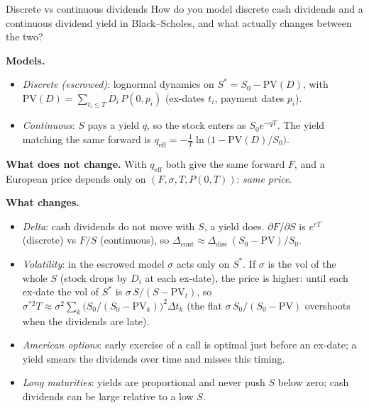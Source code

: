 \begin{question}{\Theory {}}{Discrete vs continuous dividends}
How do you model discrete cash dividends and a continuous dividend yield in
Black--Scholes, and what actually changes between the two?
\end{question}
\begin{answer}
\textbf{Models.}
\begin{itemize}[nosep]
  \item \emph{Discrete (escrowed)}: lognormal dynamics on
        $S^* = S_0 - \mathrm{PV}(D)$, with
        $\mathrm{PV}(D) = \sum_{t_i \le T} D_i\,P(0,p_i)$ (ex-dates $t_i$, payment dates $p_i$).
  \item \emph{Continuous}: $S$ pays a yield $q$, so the stock enters as
        $S_0 e^{-qT}$. The yield matching the same forward is
        $q_{\text{eff}} = -\frac{1}{T}\ln\!\big(1 - \mathrm{PV}(D)/S_0\big)$.
\end{itemize}

\textbf{What does not change.} With $q_{\text{eff}}$ both give the same
forward $F$, and a European price depends only on $(F,\sigma,T,P(0,T))$:
\emph{same price}.

\textbf{What changes.}
\begin{itemize}[nosep]
  \item \emph{Delta}: cash dividends do not move with $S$, a yield does.
        $\partial F/\partial S$ is $e^{rT}$ (discrete) vs $F/S$ (continuous),
        so $\Delta_{\text{cont}} \approx \Delta_{\text{disc}}\,(S_0-\mathrm{PV})/S_0$.
  \item \emph{Volatility}: in the escrowed model $\sigma$ acts only on $S^*$.
        If $\sigma$ is the vol of the whole $S$ (stock drops by $D_i$ at each
        ex-date), the price is higher: until each ex-date the vol of $S^*$ is
        $\sigma\,S/(S-\mathrm{PV}_t)$, so
        $\sigma^{*2} T \approx \sigma^2 \sum_k \big(S_0/(S_0-\mathrm{PV}_k)\big)^2 \Delta t_k$
        (the flat $\sigma\,S_0/(S_0-\mathrm{PV})$ overshoots when the dividends are late).
  \item \emph{American options}: early exercise of a call is optimal just before
        an ex-date; a yield smears the dividends over time and misses
        this timing.
  \item \emph{Long maturities}: yields are proportional and never push $S$
        below zero; cash dividends can be large relative to a low $S$.
\end{itemize}
\end{answer}

